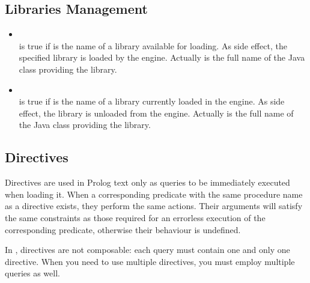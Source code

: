 \subsection{Libraries Management}

\begin{itemize}
%
 \item {}\\
 \noindent{} is true if
  is the name of a \tuprolog{} library available
 for loading. As side effect, the specified library is loaded by
 the engine. Actually  is the full name of
 the Java class providing the library.\\
 \noindent{}
%
 \item {}\\
 \noindent{} is true if
  is the name of a library currently loaded in the
 engine. As side effect, the library is unloaded from the engine. Actually  is the full name of
 the Java class providing the library.\\
 \noindent{}
%
\end{itemize}

\subsection{Directives}

Directives are used in Prolog text only as queries to be immediately executed when loading it. When a corresponding predicate with the same procedure name as a directive exists, they perform the same actions. Their arguments will satisfy the same constraints as those required for an errorless execution of the corresponding predicate, otherwise their behaviour is undefined.

In \tuprolog{}, directives are not composable: each query must contain one and only one directive. When you need to use multiple directives, you must employ multiple queries as well.

